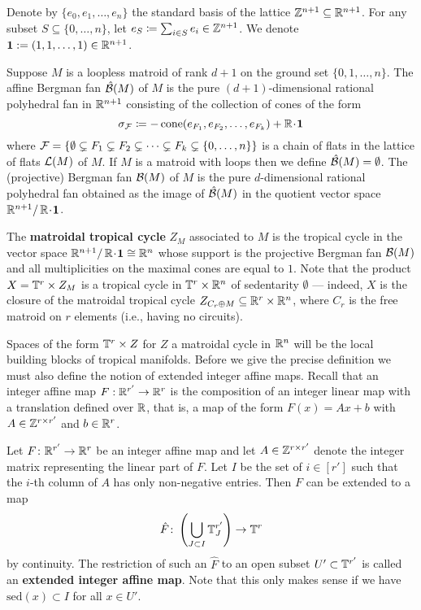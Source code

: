 \begin{exa}
Denote by $\{e_0, e_1, \dotsc, e_n\}$ the standard basis of the lattice ${\mathbb Z}^{n+1} \subseteq \mathbb{R}^{n+1}$. 
For any subset $S \subseteq \{0,\dotsc,n\}$, let $e_S \coloneqq \sum_{i\in S} e_i \in {\mathbb Z}^{n+1}$.
We denote $\mathbf 1 := (1,1,\dots,1) \in {\mathbb R}^{n+1}$.

Suppose $M$ is a loopless matroid of rank $d+1$ on the ground set $\{0,1,\dots,n\}$. 
The {affine Bergman fan} $\hat{{\mathcal B}}(M)$ of $M$ 
is the pure $(d+1)$-dimensional rational polyhedral fan in $\mathbb{R}^{n+1}$ consisting of the collection of cones of the form 
\[\sigma_\mathcal F \coloneqq  -\operatorname{cone}(e_{F_1},e_{F_2},\dotsc,e_{F_k}) + {\mathbb R} \!\cdot\! \mathbf 1\]
where 
$\mathcal F = \{\emptyset \subsetneq F_1 \subsetneq F_2 \subsetneq \dotsb \subsetneq F_k \subsetneq \{0,\dotsc, n\}\}$ is a chain of flats in the lattice of flats ${\mathcal L}(M)$ of $M$. 
If $M$ is a matroid with loops then we define $\hat{{\mathcal B}}(M) = \emptyset$.
The {(projective) Bergman fan} ${\mathcal B}(M)$ of $M$
is the pure $d$-dimensional rational polyhedral fan obtained as the image of $\hat{{\mathcal B}}(M)$ 
in the quotient vector space $\mathbb{R}^{n+1} / \,{\mathbb R} \!\cdot\! \mathbf 1$.

The {\bf matroidal tropical cycle} $Z_M$ associated to $M$ is the tropical cycle in the vector space $\mathbb{R}^{n+1} / \,{\mathbb R} \!\cdot\! \mathbf 1 \cong \mathbb{R}^n$ whose support is the projective Bergman fan 
${\mathcal B}(M)$ and all multiplicities on the maximal cones are equal to $1$. 
Note that the product $ X = \mathbb{T}^r \times Z_M$ is a tropical cycle in $\mathbb{T}^r \times \mathbb{R}^n$ of sedentarity $\emptyset$ --- indeed, $X$ is the closure of the matroidal tropical cycle $Z_{C_r \oplus M} \subseteq \mathbb{R}^r \times \mathbb{R}^n$, where $C_r$ is the free matroid on $r$ elements (i.e., having no circuits).
\end{exa}

Spaces of the form $\mathbb{T}^r \times Z$ for $Z$ a matroidal cycle in $\mathbb{R}^n$ will be the local building blocks of tropical manifolds. Before we give the precise definition we must also define the notion of {extended integer affine maps}. Recall that an integer affine map $F: \mathbb{R}^{r'} \to \mathbb{R}^r$ is the composition of an integer linear map with a translation defined over $\mathbb{R}$, that is, a map of the form $F(x) = Ax + b$ with $A \in {\mathbb Z}^{r \times r'}$ and $b \in {\mathbb R}^r$.



\begin{defi}
\label{def:integeraffmap}
Let $F\colon  \mathbb{R}^{r'} \rightarrow \mathbb{R}^r$ be an integer affine map and let $A \in {\mathbb Z}^{r \times r'}$ denote the integer matrix representing the linear part of $F$. Let $I$ be the set of 
$i \in [r']$ such that the $i$-th column of $A$ has only non-negative
entries. 
Then $F$ can be extended to a map 
$$\hat F\colon \left( \bigcup \limits_{J \subset I} \mathbb{T}^{r'}_J \right)\rightarrow {\mathbb T}^r$$ 
by continuity. 
The restriction of such an $\hat F$ to an open subset $U' \subset {\mathbb T}^{r'}$ is called an \textbf{extended integer affine map}. Note that this only makes sense if we have $\text{sed}(x) \subset I$ for all $x \in U'$. 
\end{defi}

